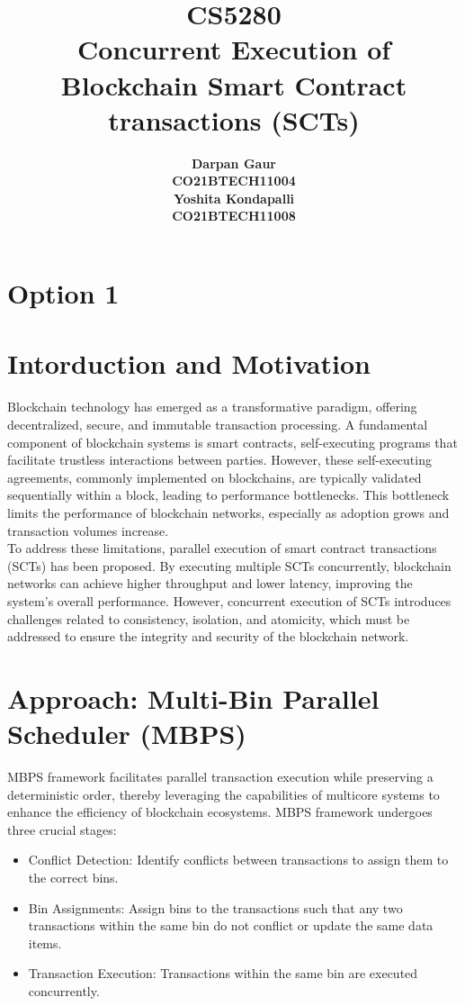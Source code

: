 \documentclass[12pt]{article}
\title{
    \textbf{CS5280} \\
    \textbf{Concurrent Execution of Blockchain Smart Contract transactions (SCTs)} \\ 
}
\author{
    \begin{tabular}{c}
        \textbf{Darpan Gaur} \\
        \textbf{CO21BTECH11004}
    \end{tabular}
    \begin{tabular}{c}
        \textbf{Yoshita Kondapalli} \\
        \textbf{CO21BTECH11008}
    \end{tabular}
}
\date{}
\begin{document}
\maketitle

\hrulefill

\section*{Option 1}

\section*{Intorduction and Motivation}
Blockchain technology has emerged as a transformative paradigm, offering decentralized, secure, and immutable transaction processing. A fundamental component of blockchain systems is smart contracts, self-executing programs that facilitate trustless interactions between parties. However, these self-executing agreements, commonly implemented on blockchains, are typically validated sequentially within a block, leading to performance bottlenecks. This bottleneck limits the performance of blockchain networks, especially as adoption grows and transaction volumes increase. 
\\
To address these limitations, parallel execution of smart contract transactions (SCTs) has been proposed. By executing multiple SCTs concurrently, blockchain networks can achieve higher throughput and lower latency, improving the system's overall performance. However, concurrent execution of SCTs introduces challenges related to consistency, isolation, and atomicity, which must be addressed to ensure the integrity and security of the blockchain network.


\section*{Approach: Multi-Bin Parallel Scheduler (MBPS)}
MBPS framework facilitates parallel transaction execution while preserving a deterministic order, thereby leveraging the capabilities of multicore systems to enhance the efficiency of blockchain ecosystems. MBPS framework undergoes three crucial stages:
\begin{itemize}
    \item Conflict Detection: Identify conflicts between transactions to assign them to the correct bins.
    \item Bin Assignments: Assign bins to the transactions such that any two transactions within the same bin do not conflict or update the same data items.
    \item Transaction Execution: Transactions within the same bin are executed concurrently.
\end{itemize}
\end{document}
